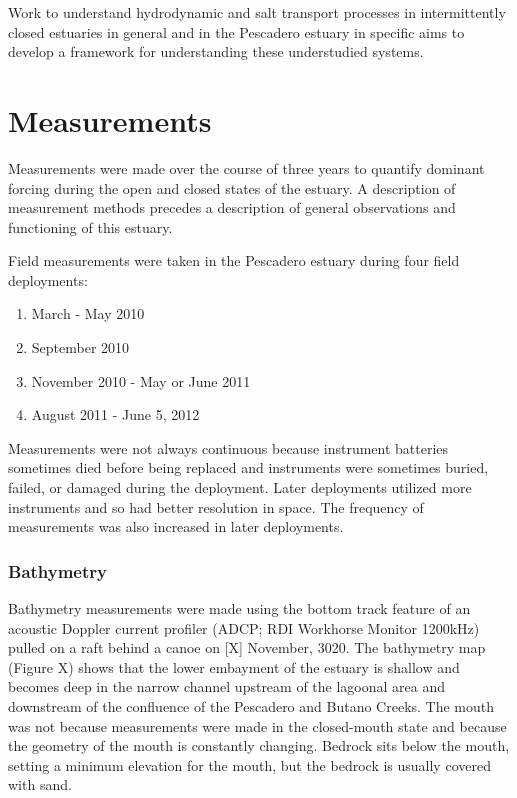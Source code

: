Work to understand hydrodynamic and salt transport processes in intermittently closed estuaries in general and in the Pescadero estuary in specific aims to develop a framework for understanding these understudied systems. 

\section{Measurements} \label{measurementslabel}

Measurements were made over the course of three years to quantify dominant forcing during the open and closed states of the estuary. A description of measurement methods precedes a description of general observations and functioning of this estuary.

Field measurements were taken in the Pescadero estuary during four field deployments:

\begin{enumerate}
	\item March - May 2010 
	\item September 2010 
	\item November 2010 - May or June 2011 
	\item August 2011 - June 5, 2012
\end{enumerate}

 Measurements were not always continuous because instrument batteries sometimes died before being replaced and 
instruments were sometimes buried, failed, or damaged during the deployment. Later deployments utilized more instruments 
and so had better resolution in space.  The frequency of measurements was also increased
in later deployments. 

\subsubsection{Bathymetry} \label{sssec:bathymetry}
Bathymetry measurements were made using the bottom track feature of an acoustic Doppler current profiler (ADCP; RDI Workhorse Monitor 1200kHz) pulled on a raft behind a canoe on [X] November, 3020. The bathymetry map (Figure X) shows that the lower embayment of the estuary is shallow and becomes deep in the narrow channel upstream of the lagoonal area and downstream of the confluence of the Pescadero and Butano Creeks. The mouth was not because measurements were made in the closed-mouth state and because the geometry of the mouth is constantly changing. Bedrock sits below the mouth, setting a minimum elevation for the mouth, but the bedrock is usually covered with sand. 

